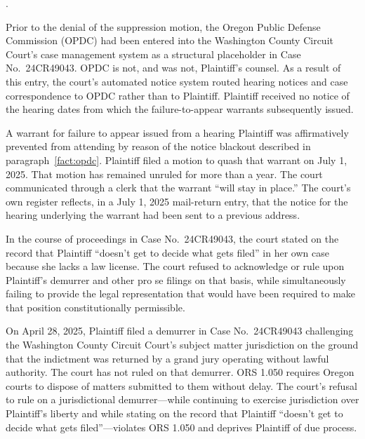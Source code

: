 \documentclass[12pt,letterpaper]{article}
\newcounter{complaintpara}
\newenvironment{paras}{%
	\begin{list}{\arabic{complaintpara}.}{%
			\setlength{\leftmargin}{0.5in}%
			\setlength{\labelwidth}{0.4in}%
			\setlength{\labelsep}{0.1in}%
			\setlength{\itemsep}{0pt}%
			\setlength{\parsep}{0pt}%
			\setlength{\topsep}{6pt}%
		}%
	}{%
	\end{list}%
}
\begin{document}
\begin{paras}
		\item\label{fact:opdc} Prior to the denial of the suppression
		motion, the Oregon Public Defense Commission (OPDC) had been
		entered into the Washington County Circuit Court's case
		management system as a structural placeholder in Case
		No.\ 24CR49043. OPDC is not, and was not, Plaintiff's counsel.
		As a result of this entry, the court's automated notice system
		routed hearing notices and case correspondence to OPDC rather
		than to Plaintiff. Plaintiff received no notice of the hearing
		dates from which the failure-to-appear warrants subsequently
		issued.
		
		\item\label{fact:fta} A warrant for failure to appear issued from
		a hearing Plaintiff was affirmatively prevented from attending
		by reason of the notice blackout described in
		paragraph~\ref{fact:opdc}. Plaintiff filed a motion to quash
		that warrant on July 1, 2025. That motion has remained unruled
		for more than a year. The court communicated through a clerk
		that the warrant ``will stay in place.'' The court's own
		register reflects, in a July 1, 2025 mail-return entry, that
		the notice for the hearing underlying the warrant had been sent
		to a previous address.
		
		\item\label{fact:doesnotgettofile} In the course of proceedings in
		Case No.\ 24CR49043, the court stated on the record that
		Plaintiff ``doesn't get to decide what gets filed'' in her own
		case because she lacks a law license. The court refused to
		acknowledge or rule upon Plaintiff's demurrer and other pro se
		filings on that basis, while simultaneously failing to provide
		the legal representation that would have been required to make
		that position constitutionally permissible.
		
		\item\label{fact:demurrer} On April 28, 2025, Plaintiff filed a
		demurrer in Case No.\ 24CR49043 challenging the Washington
		County Circuit Court's subject matter jurisdiction on the
		ground that the indictment was returned by a grand jury
		operating without lawful authority. The court has not ruled on
		that demurrer. ORS 1.050 requires Oregon courts to dispose of
		matters submitted to them without delay. The court's refusal
		to rule on a jurisdictional demurrer---while continuing to
		exercise jurisdiction over Plaintiff's liberty and while
		stating on the record that Plaintiff ``doesn't get to decide what gets filed''---violates ORS 1.050 and deprives Plaintiff
		of due process.
		
	\end{paras}
\end{document}
